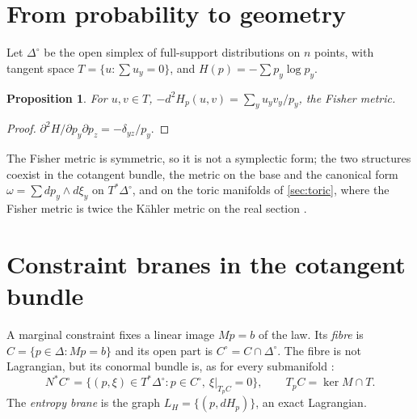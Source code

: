\documentclass[11pt]{article}
\newtheorem{proposition}[theorem]{Proposition}
\theoremstyle{definition}
\theoremstyle{remark}
\begin{document}
\section{From probability to geometry}\label{sec:geometry}

Let $\Delta^\circ$ be the open simplex of full-support distributions on $n$ points, with tangent space
$T=\{u:\sum u_y=0\}$, and $H(p)=-\sum p_y\log p_y$.

\begin{proposition}\label{prop:fisher}
For $u,v\in T$, $-d^2H_p(u,v)=\sum_yu_yv_y/p_y$, the Fisher metric.
\end{proposition}
\begin{proof}
$\partial^2H/\partial p_y\partial p_z=-\delta_{yz}/p_y$.
\end{proof}

The Fisher metric is symmetric, so it is not a symplectic form; the two structures coexist in the cotangent bundle, the
metric on the base and the canonical form $\omega=\sum dp_y\wedge d\xi_y$ on $T^*\Delta^\circ$, and on the toric manifolds of
\cref{sec:toric}, where the Fisher metric is twice the Kähler metric on the real section \cite[Prop.~6.5]{Conditionals}.

\section{Constraint branes in the cotangent bundle}\label{sec:conormal}

A marginal constraint fixes a linear image $Mp=b$ of the law. Its \emph{fibre} is $C=\{p\in\Delta:Mp=b\}$ and its open part is
$C^\circ=C\cap\Delta^\circ$. The fibre is not Lagrangian, but its conormal bundle is, as for every submanifold
\cite{McDuffSalamon2017}:
\[
N^*C^\circ=\{(p,\xi)\in T^*\Delta^\circ:p\in C^\circ,\ \xi\vert_{T_pC}=0\},\qquad T_pC=\ker M\cap T.
\]
The \emph{entropy brane} is the graph $L_H=\{(p,dH_p)\}$, an exact Lagrangian.
\end{document}
